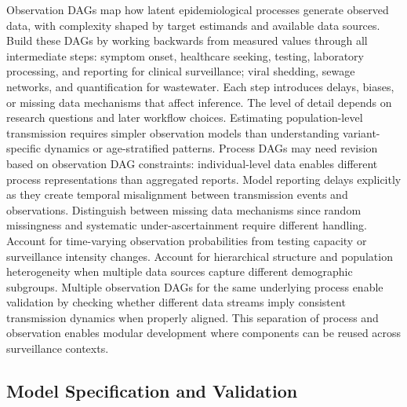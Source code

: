 \documentclass{article}
\begin{document}
Observation DAGs map how latent epidemiological processes generate observed data, with complexity shaped by target estimands and available data sources.
Build these DAGs by working backwards from measured values through all intermediate steps: symptom onset, healthcare seeking, testing, laboratory processing, and reporting for clinical surveillance; viral shedding, sewage networks, and quantification for wastewater.
Each step introduces delays, biases, or missing data mechanisms that affect inference.
The level of detail depends on research questions and later workflow choices.
Estimating population-level transmission requires simpler observation models than understanding variant-specific dynamics or age-stratified patterns.
Process DAGs may need revision based on observation DAG constraints: individual-level data enables different process representations than aggregated reports.
Model reporting delays explicitly as they create temporal misalignment between transmission events and observations.
Distinguish between missing data mechanisms since random missingness and systematic under-ascertainment require different handling.
Account for time-varying observation probabilities from testing capacity or surveillance intensity changes.
Account for hierarchical structure and population heterogeneity when multiple data sources capture different demographic subgroups.
Multiple observation DAGs for the same underlying process enable validation by checking whether different data streams imply consistent transmission dynamics when properly aligned.
This separation of process and observation enables modular development where components can be reused across surveillance contexts.


\subsection{Model Specification and Validation}\label{sec:spec-validate}
\end{document}

